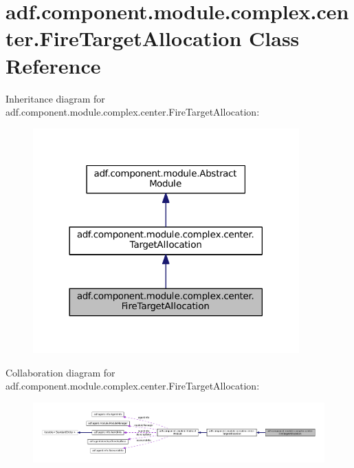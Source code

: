 \hypertarget{classadf_1_1component_1_1module_1_1complex_1_1center_1_1FireTargetAllocation}{}\section{adf.\+component.\+module.\+complex.\+center.\+Fire\+Target\+Allocation Class Reference}
\label{classadf_1_1component_1_1module_1_1complex_1_1center_1_1FireTargetAllocation}


Inheritance diagram for adf.\+component.\+module.\+complex.\+center.\+Fire\+Target\+Allocation\+:
\nopagebreak
\begin{figure}[H]
\begin{center}
\leavevmode
\includegraphics[width=290pt]{classadf_1_1component_1_1module_1_1complex_1_1center_1_1FireTargetAllocation__inherit__graph}
\end{center}
\end{figure}


Collaboration diagram for adf.\+component.\+module.\+complex.\+center.\+Fire\+Target\+Allocation\+:
\nopagebreak
\begin{figure}[H]
\begin{center}
\leavevmode
\includegraphics[width=350pt]{classadf_1_1component_1_1module_1_1complex_1_1center_1_1FireTargetAllocation__coll__graph}
\end{center}
\end{figure}
